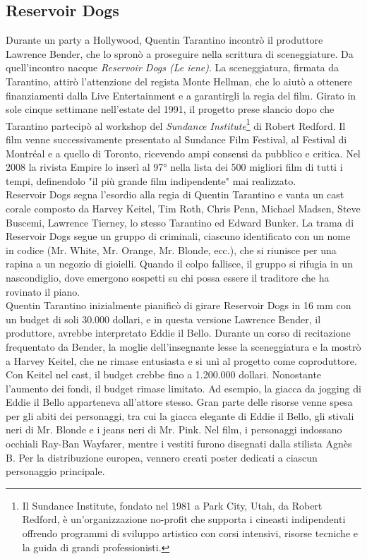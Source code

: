 \documentclass[12pt]{article} %
\begin{document}
\subsection{Reservoir Dogs}
\begin{flushleft}
    Durante un party a Hollywood, Quentin Tarantino incontrò il produttore Lawrence Bender, che lo spronò a proseguire nella scrittura di sceneggiature. 
    Da quell'incontro nacque \textit{Reservoir Dogs (Le iene)}. La sceneggiatura, firmata da Tarantino, attirò l’attenzione del regista Monte Hellman, 
    che lo aiutò a ottenere finanziamenti dalla Live Entertainment e a garantirgli la regia del film.
    Girato in sole cinque settimane nell’estate del 1991, il progetto prese slancio dopo che Tarantino partecipò al workshop del \textit{Sundance Institute}\footnote{Il Sundance Institute, fondato nel 1981 a Park City, Utah, da Robert Redford, è un'organizzazione no-profit che supporta i cineasti indipendenti offrendo programmi di sviluppo artistico con corsi intensivi, risorse tecniche e la guida di grandi professionisti.} di Robert Redford. 
    Il film venne successivamente presentato al Sundance Film Festival, al Festival di Montréal e a quello di Toronto, ricevendo ampi consensi da pubblico e critica.
    Nel 2008 la rivista Empire lo inserì al 97° nella lista dei 500 migliori film di tutti i tempi, definendolo "il più grande film indipendente" mai realizzato.\\\vspace{1cm} 
    Reservoir Dogs segna l’esordio alla regia di Quentin Tarantino e vanta un cast corale composto da Harvey Keitel, Tim Roth, Chris Penn, Michael Madsen, Steve Buscemi, Lawrence Tierney, lo stesso Tarantino ed Edward Bunker.
    La trama di Reservoir Dogs segue un gruppo di criminali, ciascuno identificato con un nome in codice (Mr. White, Mr. Orange, Mr. Blonde, ecc.), che si riunisce per una rapina a un negozio di gioielli. Quando il colpo fallisce, il gruppo si rifugia in un nascondiglio, dove emergono sospetti su chi possa essere il traditore che ha rovinato il piano. 
    \\\vspace{1cm}
    Quentin Tarantino inizialmente pianificò di girare Reservoir Dogs in 16 mm con un budget di soli 30.000 dollari, e in questa versione Lawrence Bender, il produttore, avrebbe interpretato Eddie il Bello. Durante un corso di recitazione frequentato da Bender, la moglie dell'insegnante lesse la sceneggiatura e la mostrò a Harvey Keitel, che ne rimase entusiasta e si unì al progetto come coproduttore. Con Keitel nel cast, il budget crebbe fino a 1.200.000 dollari. Nonostante l'aumento dei fondi, il budget rimase limitato. Ad esempio, la giacca da jogging di Eddie il Bello apparteneva all’attore stesso. Gran parte delle risorse venne spesa per gli abiti dei personaggi, tra cui la giacca elegante di Eddie il Bello, gli stivali neri di Mr. Blonde e i jeans neri di Mr. Pink. Nel film, i personaggi indossano occhiali Ray-Ban Wayfarer, mentre i vestiti furono disegnati dalla stilista Agnès B. Per la distribuzione europea, vennero creati poster dedicati a ciascun personaggio principale.

\end{flushleft}
\end{document}
